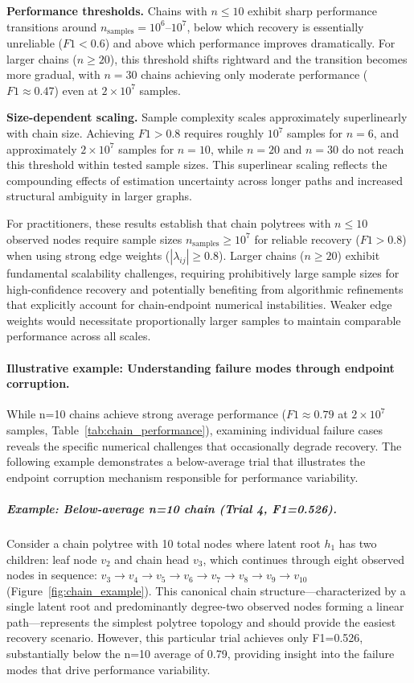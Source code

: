 \documentclass[11pt,a4paper]{article}
\numberwithin{equation}{section}
\begin{document}
\textbf{Performance thresholds.} Chains with $n \leq 10$ exhibit sharp performance transitions around $n_{\text{samples}} = 10^6$--$10^7$, below which recovery is essentially unreliable ($F1 < 0.6$) and above which performance improves dramatically. For larger chains ($n \geq 20$), this threshold shifts rightward and the transition becomes more gradual, with $n=30$ chains achieving only moderate performance ($F1 \approx 0.47$) even at $2 \times 10^7$ samples.

\textbf{Size-dependent scaling.} Sample complexity scales approximately superlinearly with chain size. Achieving $F1 > 0.8$ requires roughly $10^7$ samples for $n=6$, and approximately $2 \times 10^7$ samples for $n=10$, while $n=20$ and $n=30$ do not reach this threshold within tested sample sizes. This superlinear scaling reflects the compounding effects of estimation uncertainty across longer paths and increased structural ambiguity in larger graphs.

For practitioners, these results establish that chain polytrees with $n \leq 10$ observed nodes require sample sizes $n_{\text{samples}} \geq 10^7$ for reliable recovery ($F1 > 0.8$) when using strong edge weights ($|\lambda_{ij}| \geq 0.8$). Larger chains ($n \geq 20$) exhibit fundamental scalability challenges, requiring prohibitively large sample sizes for high-confidence recovery and potentially benefiting from algorithmic refinements that explicitly account for chain-endpoint numerical instabilities. Weaker edge weights would necessitate proportionally larger samples to maintain comparable performance across all scales.

\paragraph{Illustrative example: Understanding failure modes through endpoint corruption.} While n=10 chains achieve strong average performance ($F1 \approx 0.79$ at $2 \times 10^7$ samples, Table~\ref{tab:chain_performance}), examining individual failure cases reveals the specific numerical challenges that occasionally degrade recovery. The following example demonstrates a below-average trial that illustrates the endpoint corruption mechanism responsible for performance variability.

\subparagraph{Example: Below-average n=10 chain (Trial 4, F1=0.526).} Consider a chain polytree with 10 total nodes where latent root $h_1$ has two children: leaf node $v_2$ and chain head $v_3$, which continues through eight observed nodes in sequence: $v_3 \to v_4 \to v_5 \to v_6 \to v_7 \to v_8 \to v_9 \to v_{10}$ (Figure~\ref{fig:chain_example}). This canonical chain structure—characterized by a single latent root and predominantly degree-two observed nodes forming a linear path—represents the simplest polytree topology and should provide the easiest recovery scenario. However, this particular trial achieves only F1=0.526, substantially below the n=10 average of 0.79, providing insight into the failure modes that drive performance variability.
\end{document}

